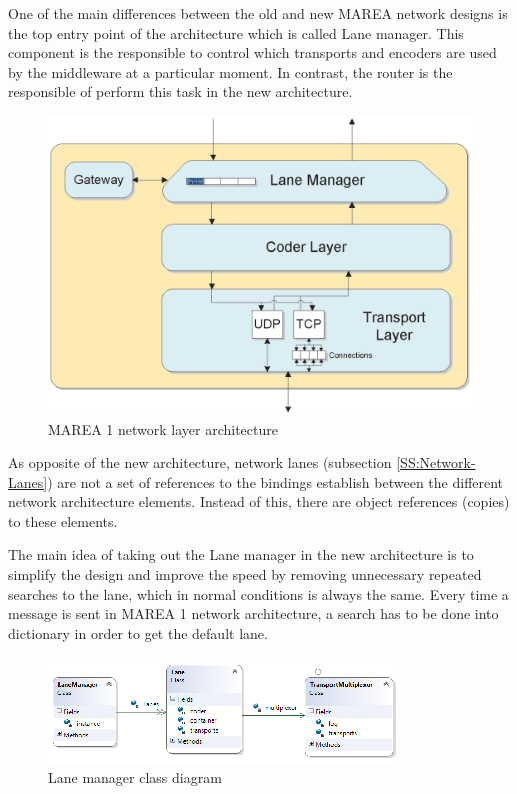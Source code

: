 One of the main differences between the old and new MAREA network designs is the top entry point of the architecture which is called Lane manager. This component is the responsible to control which transports and encoders are used by the middleware at a particular moment. In contrast, the router is the responsible of perform this task in the new architecture.

\begin{figure}[H]\begin{center}
 \centering
  \captionsetup{justification=centering}
  \includegraphics[scale=0.8]{pictures/network/NetworkOld}
  \caption{MAREA 1 network layer architecture \label{fig:network-old-architecture}}
\end{center}\end{figure}

As opposite of the new architecture, network lanes (subsection \ref{SS:Network-Lanes}) are not a set of references to the bindings establish between the different network architecture elements. Instead of this, there are object references (copies) to these elements.

The main idea of taking out the Lane manager in the new architecture is to simplify the design and improve the speed by removing unnecessary repeated searches to the lane, which in normal conditions is always the same. Every time a message is sent in MAREA 1 network architecture, a search has to be done into dictionary in order to get the default lane.

\begin{figure}[H]\begin{center}
 \centering
  \captionsetup{justification=centering}
  \includegraphics[scale=2]{pictures/network/LaneManager}
  \caption{Lane manager class diagram \label{fig:lane-manager}}
\end{center}\end{figure} 

